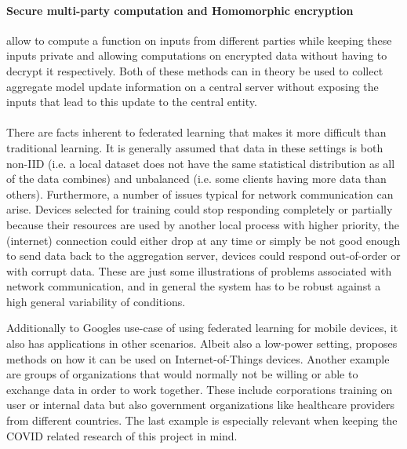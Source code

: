 \paragraph{Secure multi-party computation and Homomorphic encryption} allow to compute a function on inputs from different parties while keeping these inputs private\cite{wiki_smpc} and allowing computations on encrypted data without having to decrypt it\cite{wiki_he} respectively. Both of these methods can in theory be used to collect aggregate model update information on a central server without exposing the inputs that lead to this update to the central entity. 
\\\\
There are facts inherent to federated learning that makes it more difficult than traditional learning.
It is generally assumed that data in these settings is both non-IID (i.e. a local dataset does not have the same statistical distribution as all of the data combines) and unbalanced (i.e. some clients having more data than others). 
Furthermore, a number of issues typical for network communication can arise. Devices selected for training could stop responding completely or partially because their resources are used by another local process with higher priority, the (internet) connection could either drop at any time or simply be not good enough to send data back to the aggregation server, devices could respond out-of-order or with corrupt data. These are just some illustrations of problems associated with network communication, and in general the system has to be robust against a high general variability of conditions.

Additionally to Googles use-case of using federated learning for mobile devices, it also has applications in other scenarios. Albeit also a low-power setting, \cite{iot_fl} proposes methods on how it can be used on Internet-of-Things devices. Another example are groups of organizations that would normally not be willing or able to exchange data in order to work together. These include corporations training on user or internal data but also government organizations like healthcare providers from different countries. The last example is especially relevant when keeping the COVID related research of this project in mind. 

